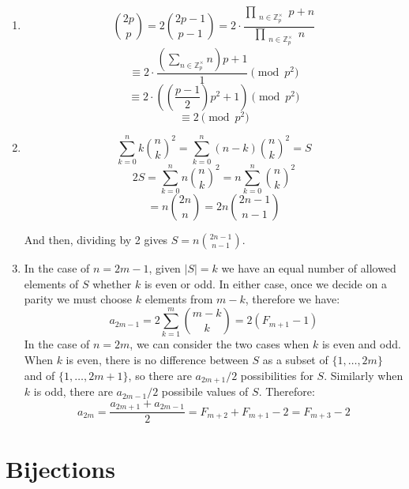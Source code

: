 \documentclass{book}
\numberwithin{equation}{section}
\begin{document}
\begin{enumerate}[label={3.\arabic*}]
\item
$${2p \choose p} = 2 {2p-1 \choose p-1} = 2 \cdot \frac{\prod_{\substack{n \in \mathbb{Z}_p^{\times}}} p + n}{\prod_{\substack{n \in \mathbb{Z}_p^{\times}}} n}$$
$$\equiv 2 \cdot \frac{\left( \sum_{n \in \mathbb{Z}_p^{\times}} n \right)p + 1}{1} \pmod{p^2}$$
$$\equiv 2 \cdot \left( \left( \frac{p-1}{2} \right) p^2 + 1 \right) \pmod{p^2}$$
$$\equiv 2 \pmod{p^2}$$

\item
$$\sum_{k=0}^n k {n \choose k}^2 = \sum_{k=0}^n (n-k) {n \choose k}^2 = S$$
$$2S = \sum_{k=0}^n n {n \choose k}^2 = n\sum_{k=0}^n {n \choose k}^2$$
$$= n{2n \choose n} = 2n{2n-1 \choose n-1}$$

And then, dividing by 2 gives $S = n{2n-1 \choose n-1}$.

\item
In the case of $n = 2m-1$, given $|S| = k$ we have an equal number of allowed elements of $S$ whether $k$
is even or odd. In either case, once we decide on a parity we must choose $k$ elements from $m-k$, therefore we have:
$$a_{2m-1} = 2 \sum_{k=1}^m {m-k \choose k} = 2(F_{m+1} - 1)$$
In the case of $n = 2m$, we can consider the two cases when $k$ is even and odd.
When $k$ is even, there is no difference between $S$
as a subset of $\{1, \ldots, 2m\}$ and of $\{1, \ldots, 2m+1\}$, so there are $a_{2m+1}/2$ possibilities for $S$.
Similarly when $k$ is odd, there are $a_{2m-1}/2$ possibile values of $S$. Therefore:
$$a_{2m} = \frac{a_{2m+1} + a_{2m-1}}{2} = F_{m+2} + F_{m+1} - 2 = F_{m+3} - 2$$

\end{enumerate}

\chapter{Bijections}
\end{document}
